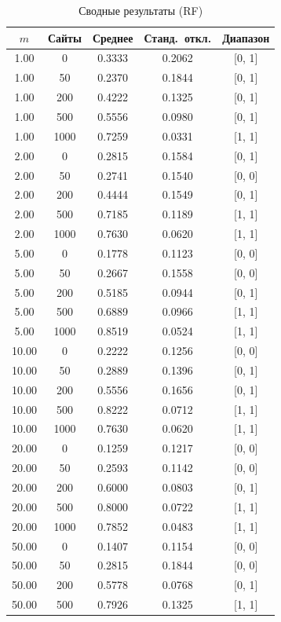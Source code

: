 \documentclass{article}
\begin{document}
\begin{table}[h]
\centering
\caption{Сводные результаты (RF)}
\label{tab:rf}
\begin{tabular}{ccccc}
\hline
$m$ & Сайты & Среднее & Станд.~откл. & Диапазон \\
\hline
1.00 & 0 & 0.3333 & 0.2062 & [0, 1] \\
1.00 & 50 & 0.2370 & 0.1844 & [0, 1] \\
1.00 & 200 & 0.4222 & 0.1325 & [0, 1] \\
1.00 & 500 & 0.5556 & 0.0980 & [0, 1] \\
1.00 & 1000 & 0.7259 & 0.0331 & [1, 1] \\
2.00 & 0 & 0.2815 & 0.1584 & [0, 1] \\
2.00 & 50 & 0.2741 & 0.1540 & [0, 0] \\
2.00 & 200 & 0.4444 & 0.1549 & [0, 1] \\
2.00 & 500 & 0.7185 & 0.1189 & [1, 1] \\
2.00 & 1000 & 0.7630 & 0.0620 & [1, 1] \\
5.00 & 0 & 0.1778 & 0.1123 & [0, 0] \\
5.00 & 50 & 0.2667 & 0.1558 & [0, 0] \\
5.00 & 200 & 0.5185 & 0.0944 & [0, 1] \\
5.00 & 500 & 0.6889 & 0.0966 & [1, 1] \\
5.00 & 1000 & 0.8519 & 0.0524 & [1, 1] \\
10.00 & 0 & 0.2222 & 0.1256 & [0, 0] \\
10.00 & 50 & 0.2889 & 0.1396 & [0, 1] \\
10.00 & 200 & 0.5556 & 0.1656 & [0, 1] \\
10.00 & 500 & 0.8222 & 0.0712 & [1, 1] \\
10.00 & 1000 & 0.7630 & 0.0620 & [1, 1] \\
20.00 & 0 & 0.1259 & 0.1217 & [0, 0] \\
20.00 & 50 & 0.2593 & 0.1142 & [0, 0] \\
20.00 & 200 & 0.6000 & 0.0803 & [0, 1] \\
20.00 & 500 & 0.8000 & 0.0722 & [1, 1] \\
20.00 & 1000 & 0.7852 & 0.0483 & [1, 1] \\
50.00 & 0 & 0.1407 & 0.1154 & [0, 0] \\
50.00 & 50 & 0.2815 & 0.1844 & [0, 0] \\
50.00 & 200 & 0.5778 & 0.0768 & [0, 1] \\
50.00 & 500 & 0.7926 & 0.1325 & [1, 1] \\

\end{tabular}
\end{table}
\end{document}
